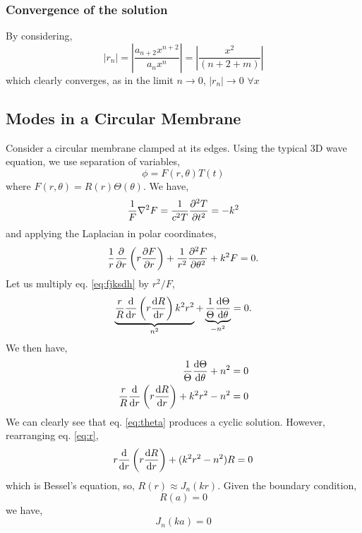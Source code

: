 \documentclass{book}
\begin{document}
\subsubsection{Convergence of the solution}
By considering,
\begin{equation}
	\left|r_n\right| = \left|\frac{a_{n+2}x^{n+2}}{a_nx^n}\right| = \left|\frac{x^2}{(n+2 +m)}\right|
\end{equation}
which clearly converges, as in the limit $n \to 0$, $\left|r_n\right| \to 0$ $\forall x$
\subsection{Modes in a Circular Membrane}
Consider a circular membrane clamped at its edges. Using the typical 3D wave equation, we use separation of variables,
\begin{equation}
	\phi = F(r,\theta)T(t)
\end{equation}
where $F(r,\theta) = R(r)\Theta(\theta)$. We have,
\begin{equation}
	\frac{1}{F}\laplacian{F} = \frac{1}{c^2T}\pdv[2]{T}{t} = - k^2
\end{equation}
and applying the Laplacian in polar coordinates,
\begin{equation}
	\frac{1}{r}\pdv{r}\left(r\pdv{F}{r}\right) + \frac{1}{r^2} \pdv[2]{F}{\theta} + k^2F = 0. \label{eq:fjksdh}
\end{equation}
Let us multiply eq. \eqref{eq:fjksdh} by $r^2/F$,
\begin{equation}
	\underbrace{\frac{r}{R}\dv{r}\left(r\dv{R}{r}\right) k^2r^2}_{n^2}  + \underbrace{\frac{1}{\Theta}\dv{\Theta}{\theta}}_{-n^2} = 0.
\end{equation}
We then have,
\begin{align}
	\frac{1}{\Theta}\dv{\Theta}{\theta} + n^2 = 0 \label{eq:theta}\\
	\frac{r}{R}\dv{r}\left(r\dv{R}{r}\right) + k^2r^2 - n^2 = 0 \label{eq:r}
\end{align}
We can clearly see that eq. \eqref{eq:theta} produces a cyclic solution. However, rearranging eq. \eqref{eq:r},
\begin{equation}
	r\dv{r}\left(r\dv{R}{r}\right) + (k^2r^2 - n^2)R = 0
\end{equation}
which is Bessel's equation, so, $R(r) \approx J_n(kr)$. Given the boundary condition,
\begin{equation}
	R(a) = 0
\end{equation}
we have,
\begin{equation}
	J_n(ka) = 0
\end{equation}
\end{document}
